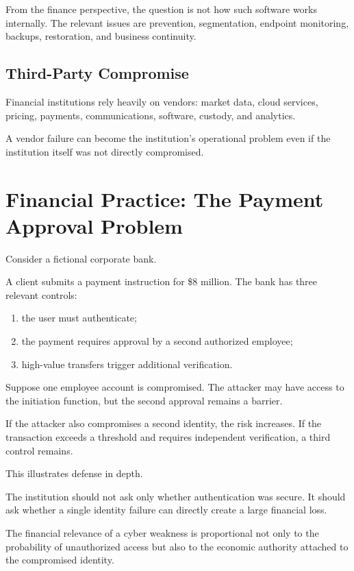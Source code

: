 From the finance perspective, the question is not how such software works internally. The relevant issues are prevention, segmentation, endpoint monitoring, backups, restoration, and business continuity.

\subsection{Third-Party Compromise}

Financial institutions rely heavily on vendors: market data, cloud services, pricing, payments, communications, software, custody, and analytics.

A vendor failure can become the institution's operational problem even if the institution itself was not directly compromised.

\section{Financial Practice: The Payment Approval Problem}

Consider a fictional corporate bank.

A client submits a payment instruction for \$8 million. The bank has three relevant controls:

\begin{enumerate}
    \item the user must authenticate;
    \item the payment requires approval by a second authorized employee;
    \item high-value transfers trigger additional verification.
\end{enumerate}

Suppose one employee account is compromised. The attacker may have access to the initiation function, but the second approval remains a barrier.

If the attacker also compromises a second identity, the risk increases. If the transaction exceeds a threshold and requires independent verification, a third control remains.

This illustrates defense in depth.

The institution should not ask only whether authentication was secure. It should ask whether a single identity failure can directly create a large financial loss.

\begin{risklens}
The financial relevance of a cyber weakness is proportional not only to the probability of unauthorized access but also to the economic authority attached to the compromised identity.
\end{risklens}

